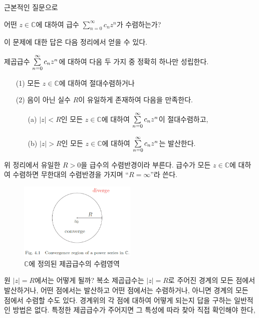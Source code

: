 근본적인 질문으로 
\begin{center}
어떤 $z\in\mathbb C$에 대하여  급수 $\sum_{n=0}^\infty c_nz^n$가 수렴하는가?
\end{center}

이 문제에 대한 답은 다음 정리에서 얻을 수 있다.

\begin{salttheorem}{}{} \label{thm-4-1}
제곱급수 $\sum\limits_{n=0}^\infty c_nz^n$에 대하여
다음 두 가지 중 정확히 하나만 성립한다.
\begin{itemize}
\item[(1)] 모든 $z\in\mathbb C$에 대하여 절대수렴하거나
\item[(2)] 음이 아닌 실수 $R$이 유일하게 존재하여 다음을 만족한다.
\begin{itemize}
\item[(a)] $|z|<R$인 모든 $z\in\mathbb C$에 대하여 $\sum\limits_{n=0}^\infty c_nz^n$이 절대수렴하고,
\item[(b)] $|z|>R$인 모든 $z\in\mathbb C$에 대하여 $\sum\limits_{n=0}^\infty c_nz^n$는 발산한다.
\end{itemize}
\end{itemize}
\end{salttheorem}

위 정리에서 유일한 $R>0$을 급수의 수렴반경이라 부른다.
급수가 모든 $z\in\mathbb C$에 대하여 수렴하면
무한대의 수렴반경을 가지며 ``$R=\infty$''라 쓴다.

\begin{figure}[h!]
\begin{center}
\includegraphics[width=0.5\textwidth]{./SaltChapter/fig-4-1}
\end{center}
\caption{$\mathbb C$에 정의된 제곱급수의 수렴영역}
\label{fig-4-1}
\end{figure}

원 $|z|=R$에서는 어떻게 될까?
복소 제곱급수는 $|z|=R$로 주어진 경계의 모든 점에서 발산하거나,
어떤 점에서는 발산하고 어떤 점에서는 수렴하거나,
아니면 경계의 모든 점에서 수렴할 수도 있다.
경계위의 각 점에 대하여 어떻게 되는지 답을 구하는 일반적인 방법은 없다.
특정한 제곱급수가 주어지면 그 특성에 따라 찾아 직접 확인해야 한다,

